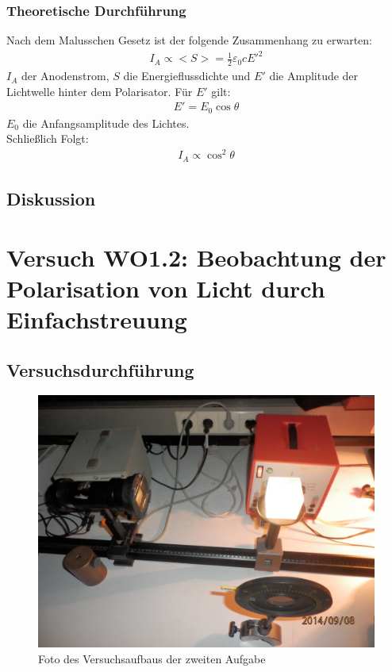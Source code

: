 \documentclass[12pt]{scrartcl}
\begin{document}
\subsubsection{Theoretische Durchführung}
Nach dem Malusschen Gesetz ist der folgende Zusammenhang zu erwarten:
\begin{align}
I_A \propto <S> = \frac{1}{2} \varepsilon_0 c E'^2
\end{align}
$I_A$ der Anodenstrom, $S$ die Energieflussdichte und $E'$ die Amplitude der Lichtwelle hinter dem Polarisator.
Für $E'$ gilt:
\begin{align}
E' = E_0 \cos{\theta}
\end{align}
$E_0$ die Anfangsamplitude des Lichtes.\\
Schließlich Folgt:
\begin{align}
I_A \propto \cos^2{\theta}
\end{align}
\subsection{Diskussion}

\section{Versuch WO1.2: Beobachtung der Polarisation von Licht durch Einfachstreuung}
\subsection{Versuchsdurchführung}

\begin{figure}[H]
\centering
    \includegraphics[scale = 0.1]{aufgabe_2.JPG}
  	\caption[Foto des Versuchsaufbaus der zweiten Aufgabe]{Foto des Versuchsaufbaus der zweiten Aufgabe}
  \label{fig:aufgabe_2}
\end{figure}
\end{document}
